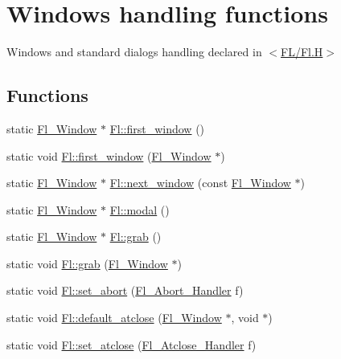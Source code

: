 \hypertarget{group__fl__windows}{}\section{Windows handling functions}
\label{group__fl__windows}


Windows and standard dialogs handling declared in $<$\hyperlink{_fl_8_h}{F\+L/\+Fl.\+H}$>$  


\subsection*{Functions}
\begin{DoxyCompactItemize}
\item 
static \hyperlink{class_fl___window}{Fl\+\_\+\+Window} $\ast$ \hyperlink{group__fl__windows_gaaaaa9daf38c17c58fd895794d3f2d94d}{Fl\+::first\+\_\+window} ()
\item 
static void \hyperlink{group__fl__windows_ga9bb84d6037167241f497f5b78e8b94eb}{Fl\+::first\+\_\+window} (\hyperlink{class_fl___window}{Fl\+\_\+\+Window} $\ast$)
\item 
static \hyperlink{class_fl___window}{Fl\+\_\+\+Window} $\ast$ \hyperlink{group__fl__windows_ga3377fa667615bfa756925d50f98817d1}{Fl\+::next\+\_\+window} (const \hyperlink{class_fl___window}{Fl\+\_\+\+Window} $\ast$)
\item 
static \hyperlink{class_fl___window}{Fl\+\_\+\+Window} $\ast$ \hyperlink{group__fl__windows_gaf0938156f04e1babebaa8eb75a8d0fce}{Fl\+::modal} ()
\item 
static \hyperlink{class_fl___window}{Fl\+\_\+\+Window} $\ast$ \hyperlink{group__fl__windows_ga100705a8107397cfde7318aa34019739}{Fl\+::grab} ()
\item 
static void \hyperlink{group__fl__windows_gaff9d012f19ac1d15214847bbabd5a890}{Fl\+::grab} (\hyperlink{class_fl___window}{Fl\+\_\+\+Window} $\ast$)
\item 
static void \hyperlink{group__fl__windows_gaa52e562142bd1e8d5ba6915ff5577245}{Fl\+::set\+\_\+abort} (\hyperlink{group__callback__functions_gab06d501e53b8fe82de6d70937fb22f95}{Fl\+\_\+\+Abort\+\_\+\+Handler} f)
\item 
static void \hyperlink{group__fl__windows_ga74bc23b2e0837cc509c18bcd56aa5dc7}{Fl\+::default\+\_\+atclose} (\hyperlink{class_fl___window}{Fl\+\_\+\+Window} $\ast$, void $\ast$)
\item 
static void \hyperlink{group__fl__windows_gafe2b995bdaf60c5a5b2326e8845897c9}{Fl\+::set\+\_\+atclose} (\hyperlink{group__callback__functions_gac2b36f6e136744adb3e3ec87e068c169}{Fl\+\_\+\+Atclose\+\_\+\+Handler} f)
\end{DoxyCompactItemize}

